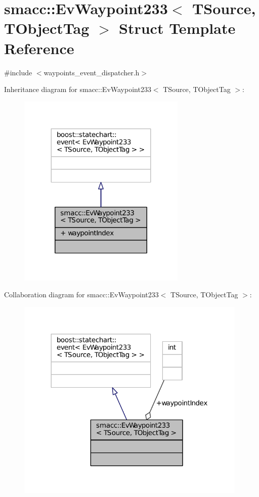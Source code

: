 \hypertarget{structsmacc_1_1EvWaypoint233}{}\section{smacc\+:\+:Ev\+Waypoint233$<$ T\+Source, T\+Object\+Tag $>$ Struct Template Reference}
\label{structsmacc_1_1EvWaypoint233}


{\ttfamily \#include $<$waypoints\+\_\+event\+\_\+dispatcher.\+h$>$}



Inheritance diagram for smacc\+:\+:Ev\+Waypoint233$<$ T\+Source, T\+Object\+Tag $>$\+:
\nopagebreak
\begin{figure}[H]
\begin{center}
\leavevmode
\includegraphics[width=227pt]{structsmacc_1_1EvWaypoint233__inherit__graph}
\end{center}
\end{figure}


Collaboration diagram for smacc\+:\+:Ev\+Waypoint233$<$ T\+Source, T\+Object\+Tag $>$\+:
\nopagebreak
\begin{figure}[H]
\begin{center}
\leavevmode
\includegraphics[width=312pt]{structsmacc_1_1EvWaypoint233__coll__graph}
\end{center}
\end{figure}
